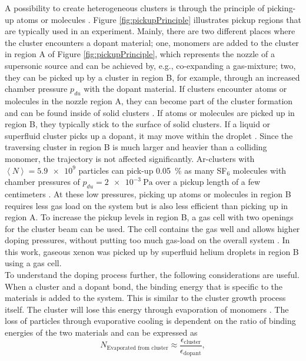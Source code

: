A possibility to create heterogeneous clusters is through the principle of picking-up atoms or molecules \citep{Haberland-1994-Springer}. Figure \ref{fig:pickupPrinciple} illustrates pickup regions that are typically used in an experiment. Mainly, there are two different places where the cluster encounters a dopant material; one, monomers are added to the cluster in region A of Figure \ref{fig:pickupPrinciple}, which represents the nozzle of a supersonic source and can be achieved by, e.g., co-expanding a gas-mixture; two, they can be picked up by a cluster in region B, for example, through an increased chamber pressure $p_{du}$ with the dopant material. If clusters encounter atoms or molecules in the nozzle region A, they can become part of the cluster formation and can be found inside of solid clusters \citep{Gough-1985-JChemPhys}. If atoms or molecules are picked up in region B, they typically stick to the surface of solid clusters. If a liquid or superfluid cluster picks up a dopant, it may move within the droplet \cite{Hartmann-1995-PRL}. Since the traversing cluster in region B is much larger and heavier than a colliding monomer, the trajectory is not affected significantly. Ar-clusters with $\left\langle N\right\rangle = \num{5.9e9}$ particles can pick-up \SI{0.05}{\percent} as many SF$_{6}$ molecules with chamber pressures of $p_{du}=\SI{2e-3}{\pascal}$ over a pickup length of a few centimeters \citep{Gough-1985-JChemPhys}. At these low pressures, picking up atoms or molecules in region B requires less gas load on the system but is also less efficient than picking up in region A. To increase the pickup levels in region B, a gas cell with two openings for the cluster beam can be used. The cell contains the gas well and allows higher doping pressures, without putting too much gas-load on the overall system \cite{Gomez-2014-Science}. In this work, gaseous xenon was picked up by superfluid helium droplets in region B using a gas cell.\\[1\baselineskip]
%
To understand the doping process further, the following considerations are useful. When a cluster and a dopant bond, the binding energy that is specific to the materials is added to the system. This is similar to the cluster growth process itself. The cluster will lose this energy through evaporation of monomers \citep{Gomez-2011-JCP}. The loss of particles through evaporative cooling is dependent on the ratio of binding energies of the two materials and can be expressed as 
\begin{equation}
N_{\text{Evaporated from cluster}} \approx \frac{\epsilon_{\text{cluster}}}{\epsilon_{\text{dopant}}},
\label{eq:evaporated-amount}
\end{equation}
